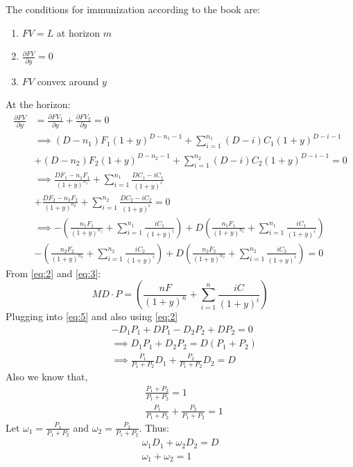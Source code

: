 \documentclass[12pt]{article}
\begin{document}
    The conditions for immunization according to the book are:
    \begin{enumerate}
        \item $FV = L$ at horizon $m$
        \item $\frac{\partial FV}{\partial y} = 0$
        \item $FV$ convex around $y$
    \end{enumerate}
    At the horizon:
    \begin{align}
        \frac{\partial FV}{\partial y} &= \frac{\partial FV_1}{\partial y} + \frac{\partial FV_2}{\partial y} = 0 \nonumber\\[10pt]
        &\implies (D-n_1)F_1(1+y)^{D-n_1-1} + \sum_{i=1}^{n_1}(D-i)C_1(1+y)^{D-i-1}\nonumber \\
        &+ (D-n_2)F_2(1+y)^{D-n_2-1} + \sum_{i=1}^{n_2}(D-i)C_2(1+y)^{D-i-1} = 0\nonumber\\[10pt]
        &\implies \frac{DF_1 - n_1F_1}{(1+y)^{n_1}} + \sum_{i=1}^{n_1} \frac{DC_1 - iC_1}{(1+y)^i} \nonumber\\ 
        &+ \frac{DF_2 - n_2F_2}{(1+y)^{n_2}} + \sum_{i=1}^{n_2} \frac{DC_2 - iC_2}{(1+y)^i} = 0 \nonumber\\[10pt]
        &\implies -\left( \frac{n_1F_1}{(1+y)^{n_1}} + \sum_{i=1}^{n_1} \frac{iC_1}{(1+y)^i} \right) + D \left( \frac{n_1F_1}{(1+y)^{n_1}} + \sum_{i=1}^{n_1} \frac{iC_1}{(1+y)^i} \right) \nonumber\\
        &- \left( \frac{n_2F_2}{(1+y)^{n_2}} + \sum_{i=1}^{n_2} \frac{iC_2}{(1+y)^i} \right) + D \left( \frac{n_2F_2}{(1+y)^{n_2}} + \sum_{i=1}^{n_2} \frac{iC_2}{(1+y)^i} \right) = 0 \label{eq:5}
    \end{align}
    From \eqref{eq:2} and \eqref{eq:3}:
    \[
        MD \cdot P =\left( \frac{nF}{(1+y)^n}+ \sum_{i=1}^{n} \frac{iC}{(1+y)^i}\right) 
    \]
    Plugging into \eqref{eq:5} and also using \eqref{eq:2}
    \begin{align*}
        & -D_1P_1 + DP_1 - D_2P_2 + DP_2 = 0 \\
        &\implies D_1P_1 + D_2P_2 = D(P_1 + P_2) \\
        &\implies \frac{P_1}{P_1+P_2} D_1 + \frac{P_2}{P_1+P_2}D_2 = D
    \end{align*}
    Also we know that,
    \begin{align*}
        & \frac{P_1+P_2}{P_1+P_2} = 1\\
        & \frac{P_1}{P_1+P_2} + \frac{P_2}{P_1+P_2} = 1
    \end{align*}
    Let $\omega_1 = \frac{P_1}{P_1 + P_2}$ and $\omega_2 = \frac{P_2}{P_1+P_2}$. Thus: \\
    \begin{align*}
        \omega_1 D_1 + \omega_2 D_2 = D \\
        \omega_1 + \omega_2 = 1
    \end{align*}
    
    \clearpage
\end{document}
